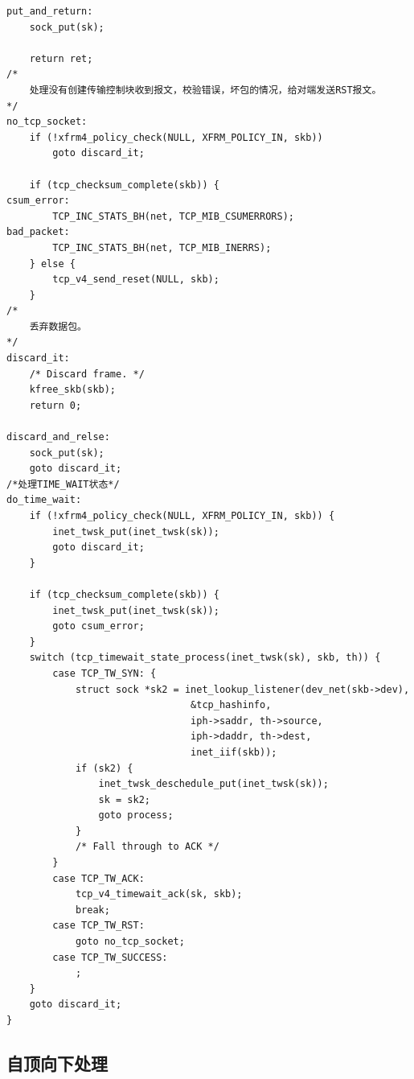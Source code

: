 \begin{verbatim}
put_and_return:
	sock_put(sk);

	return ret;
/*
	处理没有创建传输控制块收到报文，校验错误，坏包的情况，给对端发送RST报文。
*/
no_tcp_socket:
	if (!xfrm4_policy_check(NULL, XFRM_POLICY_IN, skb))
		goto discard_it;

	if (tcp_checksum_complete(skb)) {
csum_error:
		TCP_INC_STATS_BH(net, TCP_MIB_CSUMERRORS);
bad_packet:
		TCP_INC_STATS_BH(net, TCP_MIB_INERRS);
	} else {
		tcp_v4_send_reset(NULL, skb);
	}
/*
	丢弃数据包。	
*/
discard_it:
	/* Discard frame. */
	kfree_skb(skb);
	return 0;

discard_and_relse:
	sock_put(sk);
	goto discard_it;
/*处理TIME_WAIT状态*/
do_time_wait:
	if (!xfrm4_policy_check(NULL, XFRM_POLICY_IN, skb)) {
		inet_twsk_put(inet_twsk(sk));
		goto discard_it;
	}

	if (tcp_checksum_complete(skb)) {
		inet_twsk_put(inet_twsk(sk));
		goto csum_error;
	}
	switch (tcp_timewait_state_process(inet_twsk(sk), skb, th)) {
		case TCP_TW_SYN: {
			struct sock *sk2 = inet_lookup_listener(dev_net(skb->dev),
								&tcp_hashinfo,
								iph->saddr, th->source,
								iph->daddr, th->dest,
								inet_iif(skb));
			if (sk2) {
				inet_twsk_deschedule_put(inet_twsk(sk));
				sk = sk2;
				goto process;
			}
			/* Fall through to ACK */
		}
		case TCP_TW_ACK:
			tcp_v4_timewait_ack(sk, skb);
			break;
		case TCP_TW_RST:
			goto no_tcp_socket;
		case TCP_TW_SUCCESS:
			;
	}
	goto discard_it;
}
\end{verbatim}
		\subsection{自顶向下处理}
